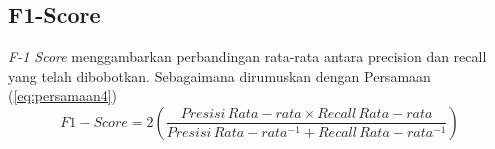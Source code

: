 \subsection{F1-Score}
\textit{F-1 Score} menggambarkan perbandingan rata-rata antara precision dan recall yang telah dibobotkan. Sebagaimana dirumuskan dengan Persamaan (\ref{eq:persamaan4})
\begin{equation}\label{eq:persamaan6}
F1-Score=2 \left( \frac{Presisi \, Rata-rata \times Recall \, Rata-rata}{Presisi \, Rata-rata^{-1} + Recall \, Rata-rata^{-1}} \right)
\end{equation} 

